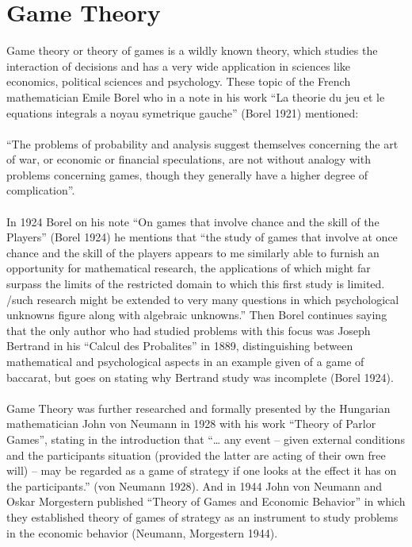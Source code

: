 \documentclass{article}
\begin{document}
\section{Game Theory}\label{first_section}
Game theory or theory of games is a wildly known theory, which studies the interaction of decisions and has a very wide application in sciences like economics, political sciences and psychology. These topic of the French mathematician Emile Borel who in a note in his work “La theorie du jeu et le equations integrals a noyau symetrique gauche” (Borel 1921) mentioned:
\\\\ “The problems of probability and analysis suggest themselves concerning the art of war, or economic or financial speculations, are not without analogy with problems concerning games, though they generally have a higher degree of complication”.
\\\\ In 1924 Borel on his note “On games that involve chance and the skill of the Players” (Borel 1924) he mentions that “the study of games that involve at once chance and the skill of the players appears to me similarly able to furnish an opportunity for mathematical research, the applications of which might far surpass the limits of the restricted domain to which this first study is limited. /such research might be extended to very many questions in which psychological unknowns figure along with algebraic unknowns.” Then Borel continues saying that the only author who had studied problems with this focus was Joseph Bertrand in his “Calcul des Probalites” in 1889, distinguishing between mathematical and psychological aspects in an example given of a game of baccarat, but goes on stating why Bertrand study was incomplete (Borel 1924).
\\\\ Game Theory was further researched and formally presented by the Hungarian mathematician John von Neumann in 1928 with his work “Theory of Parlor Games”, stating in the introduction that “… any event – given external conditions and the participants situation (provided the latter are acting of their own free will) – may be regarded as a game of strategy if one looks at the effect it has on the participants.” (von Neumann 1928). And in 1944 John von Neumann and Oskar Morgestern published “Theory of Games and Economic Behavior” in which they established theory of games of strategy as an instrument to study problems in the economic behavior (Neumann, Morgestern 1944).
\end{document}
